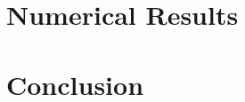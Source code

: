 \documentclass[conference]{IEEEtran}
\begin{document}
\section{Numerical Results}
\label{sec:simulation}





\section{Conclusion}
\label{sec:conclusion}















%




\end{document}
